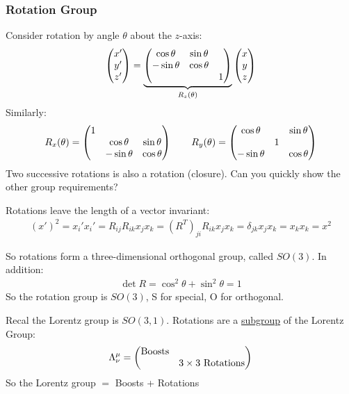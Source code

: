 \subsubsection{Rotation Group}
Consider rotation by angle $\theta$ about the $z$-axis:
\begin{align*}
  \pmqty{x'\\y'\\z'}=
  \underbrace{\pmqty{\cos\theta & \sin\theta&\\
      -\sin\theta&\cos\theta&\\&&1}}_{R_z(\theta)}
  \pmqty{x\\y\\z}
\end{align*}
Similarly:
\begin{align*}
  R_x(\theta)=
  \pmqty{1\\&\cos\theta&\sin\theta\\&-\sin\theta&\cos\theta}
  \qquad
  R_y(\theta)=
  \pmqty{\cos\theta&&\sin\theta\\&1&\\-\sin\theta&&\cos\theta}
\end{align*}
Two successive rotations is also a rotation (closure). Can you quickly show the other group requirements?

Rotations leave the length of a vector invariant:
\begin{align*}
  {(x')}^2=x_i'x_i'=R_{ij}R_{ik}x_j x_k
  ={(R^T)}_{ji}R_{ik}x_j x_k=\delta_{jk}x_j x_k
  =x_k x_k=x^2
\end{align*}

So rotations form a three-dimensional orthogonal group, called $SO(3)$. In addition:
\begin{align*}
  \det{R}=\cos^2\theta+\sin^2\theta=1
\end{align*}
So the rotation group is $SO(3)$, S for special, O for orthogonal.

Recal the Lorentz group is $SO(3,1)$. Rotations are a \underline{subgroup} of the Lorentz Group:
\begin{align*}
  \Lambda^\mu_\nu=\pmqty{\text{Boosts}&\\&3\times3\text{ Rotations}}
\end{align*}
So the Lorentz group $=$ Boosts + Rotations

